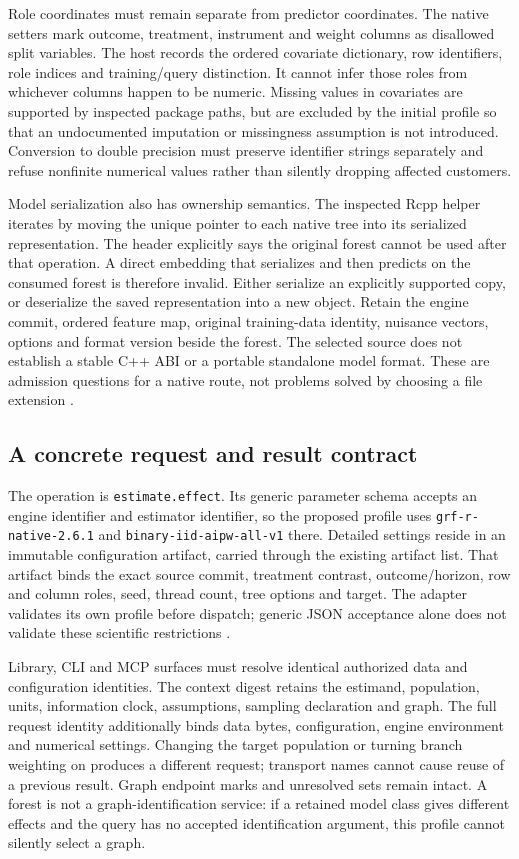 Role coordinates must remain separate from predictor coordinates. The
native setters mark outcome, treatment, instrument and weight columns as
disallowed split variables. The host records the ordered covariate
dictionary, row identifiers, role indices and training/query
distinction. It cannot infer those roles from whichever columns happen
to be numeric. Missing values in covariates are supported by inspected
package paths, but are excluded by the initial profile so that an
undocumented imputation or missingness assumption is not introduced.
Conversion to double precision must preserve identifier strings
separately and refuse nonfinite numerical values rather than silently
dropping affected customers.

Model serialization also has ownership semantics. The inspected Rcpp
helper iterates by moving the unique pointer to each native tree into
its serialized representation. The header explicitly says the original
forest cannot be used after that operation. A direct embedding that
serializes and then predicts on the consumed forest is therefore
invalid. Either serialize an explicitly supported copy, or deserialize
the saved representation into a new object. Retain the engine commit,
ordered feature map, original training-data identity, nuisance vectors,
options and format version beside the forest. The selected source does
not establish a stable C++ ABI or a portable standalone model format.
These are admission questions for a native route, not problems solved by
choosing a file extension \citep{exec13_grf_memory}.

\subsection{A concrete request and result contract}

The operation is \texttt{estimate.effect}. Its generic parameter schema
accepts an engine identifier and estimator identifier, so the proposed
profile uses \texttt{grf-r-native-2.6.1} and
\texttt{binary-iid-aipw-all-v1} there. Detailed settings reside in an
immutable configuration artifact, carried through the existing artifact
list. That artifact binds the exact source commit, treatment contrast,
outcome/horizon, row and column roles, seed, thread count, tree options
and target. The adapter validates its own profile before dispatch;
generic JSON acceptance alone does not validate these scientific
restrictions \citep{exec13_grf_design}.

Library, CLI and MCP surfaces must resolve identical authorized data and
configuration identities. The context digest retains the estimand,
population, units, information clock, assumptions, sampling declaration
and graph. The full request identity additionally binds data bytes,
configuration, engine environment and numerical settings. Changing the
target population or turning branch weighting on produces a different
request; transport names cannot cause reuse of a previous result. Graph
endpoint marks and unresolved sets remain intact. A forest is not a
graph-identification service: if a retained model class gives different
effects and the query has no accepted identification argument, this
profile cannot silently select a graph.

